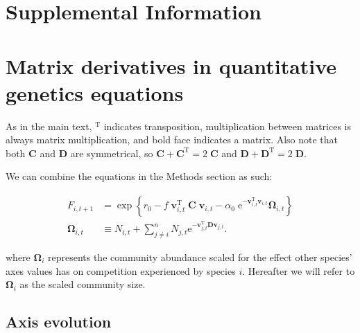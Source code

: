 

\section*{Supplemental Information}

\renewcommand{\thefigure}{S\arabic{figure}}
\renewcommand{\theequation}{S\arabic{equation}}
\renewcommand{\thetable}{S\arabic{table}}
\setcounter{equation}{0}
\setcounter{figure}{0}
\setcounter{table}{0}



\section*{Matrix derivatives in quantitative genetics equations}

As in the main text, $^{\textrm{T}}$ indicates transposition,
multiplication between matrices is always matrix multiplication, and
bold face indicates a matrix.
Also note that both $\mathbf{C}$ and $\mathbf{D}$ are symmetrical,
so $\mathbf{C} + \mathbf{C}^{\textrm{T}} = 2 \; \mathbf{C}$ and
$\mathbf{D} + \mathbf{D}^{\textrm{T}} = 2 \; \mathbf{D}$.


We can combine the equations in the Methods section as such:

\begin{equation} \label{eq:fitness-full}
\begin{split}
    F_{i,t+1} &= \exp \left\{
        r_0 - f \; \mathbf{v}_{i,t}^{\textrm{T}} \; \mathbf{C} \; \mathbf{v}_{i,t} -
        \alpha_0 \;\textrm{e}^{- \mathbf{v}_{i,t}^{\textrm{T}} \mathbf{v}_{i,t} } \mathbf{\Omega}_{i,t}
        \right\} \\
        \mathbf{\Omega}_{i,t} &\equiv N_{i,t} +
            \sum_{j \ne i}^{n}{ N_{j,t} \textrm{e}^{
            - \mathbf{v}_{j,t}^{\textrm{T}}
            \mathbf{D} \mathbf{v}_{j,t} } }
        \textrm{.}
\end{split}
\end{equation}

\noindent where $\mathbf{\Omega}_i$ represents the community abundance scaled
for the effect other species' axes values has on competition
experienced by species $i$.
Hereafter we will refer to $\mathbf{\Omega}_i$ as the scaled community size.




\subsection*{Axis evolution}


